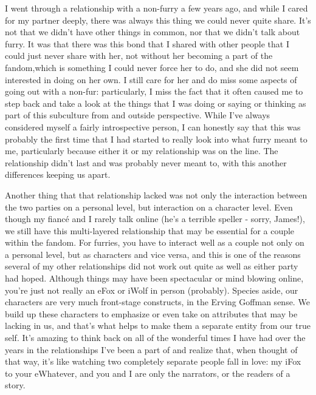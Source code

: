 I went through a relationship with a non-furry a few years ago, and
while I cared for my partner deeply, there was always this thing we
could never quite share. It's not that we didn't have other things in
common, nor that we didn't talk about furry. It was that there was this
bond that I shared with other people that I could just never share with
her, not without her becoming a part of the fandom,which is something I
could never force her to do, and she did not seem interested in doing on
her own. I still care for her and do miss some aspects of going out with
a non-fur: particularly, I miss the fact that it often caused me to step
back and take a look at the things that I was doing or saying or
thinking as part of this subculture from and outside perspective. While
I've always considered myself a fairly introspective person, I can
honestly say that this was probably the first time that I had started to
really look into what furry meant to me, particularly because either it
or my relationship was on the line. The relationship didn't last and was
probably never meant to, with this another differences keeping us apart.

Another thing that that relationship lacked was not only the interaction
between the two parties on a personal level, but interaction on a
character level. Even though my fiancé and I rarely talk online (he's a
terrible speller - sorry, James!), we still have this multi-layered
relationship that may be essential for a couple within the fandom. For
furries, you have to interact well as a couple not only on a personal
level, but as characters and vice versa, and this is one of the reasons
several of my other relationships did not work out quite as well as
either party had hoped. Although things may have been spectacular or
mind blowing online, you're just not really an eFox or iWolf in person
(probably). Species aside, our characters are very much front-stage
constructs, in the Erving Goffman sense. We build up these characters to
emphasize or even take on attributes that may be lacking in us, and
that's what helps to make them a separate entity from our true self.
It's amazing to think back on all of the wonderful times I have had over
the years in the relationships I've been a part of and realize that,
when thought of that way, it's like watching two completely separate
people fall in love: my iFox to your eWhatever, and you and I are only
the narrators, or the readers of a story.

